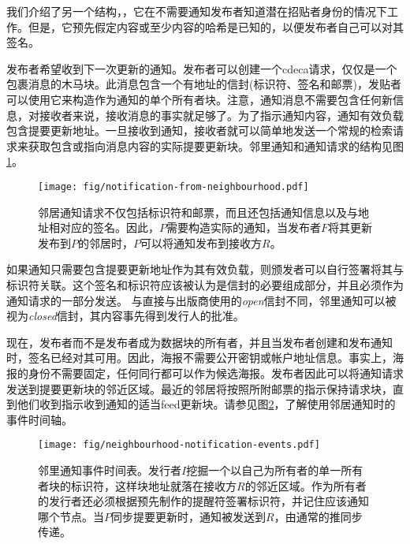 我们介绍了另一个结构，，它在不需要通知发布者知道潜在招贴者身份的情况下工作。但是，它预先假定内容或至少内容的哈希是已知的，以便发布者自己可以对其签名。


发布者希望收到下一次更新的通知。发布者可以创建一个cdeca请求，仅仅是一个包裹消息的木马块。此消息包含一个有地址的信封(标识符、签名和邮票)，发贴者可以使用它来构造作为通知的单个所有者块。注意，通知消息不需要包含任何新信息，对接收者来说，接收消息的事实就足够了。为了指示通知内容，通知有效负载包含提要更新地址。一旦接收到通知，接收者就可以简单地发送一个常规的检索请求来获取包含或指向消息内容的实际提要更新块。邻里通知和通知请求的结构见图\ref{fig:notification-from-neighbourhood}。
                                

\begin{figure}[htbp]
\centering
\texttt{[image: fig/notification-from-neighbourhood.pdf]}
\caption[社区通知\statusgreen]{邻居通知请求不仅包括标识符和邮票，而且还包括通知信息以及与地址相对应的签名。因此，$P$需要构造实际的通知，当发布者$F$将其更新发布到$P$的邻居时，$P$可以将通知发布到接收方$R$。}
\label{fig:notification-from-neighbourhood}
\end{figure}

如果通知只需要包含提要更新地址作为其有效负载，则颁发者可以自行签署将其与标识符关联。这个签名和标识符应该被认为是信封的必要组成部分，并且必须作为通知请求的一部分发送。
与直接与出版商使用的\emph{open}信封不同，邻里通知可以被视为\emph{closed}信封，其内容事先得到发行人的批准。 

现在，发布者而不是发布者成为数据块的所有者，并且当发布者创建和发布通知时，签名已经对其可用。因此，海报不需要公开密钥或帐户地址信息。事实上，海报的身份不需要固定，任何同行都可以作为候选海报。发布者因此可以将通知请求发送到提要更新块的邻近区域。最近的邻居将按照所附邮票的指示保持请求块，直到他们收到指示收到通知的适当feed更新块。请参见图\ref{fig:neighbourhood-notification-events}，了解使用邻居通知时的事件时间轴。

\begin{figure}[htbp]
\centering
\texttt{[image: fig/neighbourhood-notification-events.pdf]}
\caption[事件的邻里通知时间表\statusgreen]{邻里通知事件时间表。发行者$I$挖掘一个以自己为所有者的单一所有者块的标识符，这样块地址就落在接收方$R$的邻近区域。作为所有者的发行者还必须根据预先制作的提醒符签署标识符，并记住应该通知哪个节点。当$P$同步提要更新时，通知被发送到$R$，由通常的推同步传递。}
\label{fig:neighbourhood-notification-events}
\end{figure}
  

